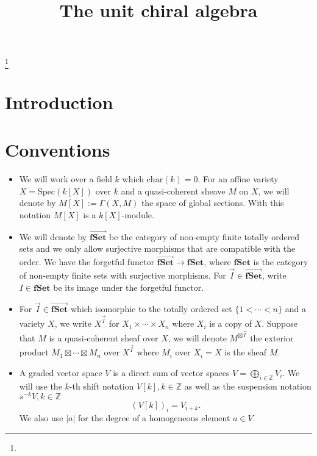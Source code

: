 \documentclass[11pt]{amsart}
\theoremstyle{definition}
\theoremstyle{remark}
\numberwithin{equation}{section}
\begin{document}
\title[]{The unit chiral algebra}%
\author{}%
\address{}%
\email{}%

\thanks{}%
\subjclass{}%
\keywords{}%

\begin{abstract}

\end{abstract}
\maketitle
\tableofcontents



\section{Introduction}
\section{Conventions}

\begin{itemize}

\item We will work over a field $k$ which $\mathrm{char}(k)=0$. For an affine variety $X=\mathrm{Spec}(k[X])$ over $k$ and a quasi-coherent sheave $M$ on $X$, we will denote by $M[X]:=\Gamma(X,M)$ the space of global sections. With this notation $M[X]$ is a $k[X]$-module.



\item We will denote by $\overrightarrow{\mathbf{fSet}}$ be the category of non-empty finite totally ordered sets and we only allow surjective morphisms that are compatible with the order. We have the forgetful functor $\overrightarrow{\mathbf{fSet}}\rightarrow \mathbf{fSet}$, where $\mathbf{fSet}$ is the category of non-empty finite sets with surjective morphisms. For $\vec{I}\in \overrightarrow{\mathbf{fSet}}$, write $I\in \mathbf{fSet}$ be its image under the forgetful functor.
\item For $\vec{I}\in \overrightarrow{\mathbf{fSet}}$ which isomorphic to the totally ordered set $\{1<\cdots<n\}$ and a variety $X$, we write $X^{\vec{I}}$ for $X_1\times \cdots \times X_n$ where $X_i$ is a copy of $X$. Suppose that $M$ is a quasi-coherent sheaf over $X$, we will denote $M^{\boxtimes\vec{I}}$ the exterior product $M_1\boxtimes \cdots \boxtimes M_n$ over $X^{\vec{I}}$ where $M_i$ over $X_i=X$ is the sheaf $M$.
\item A graded vector space $V$ is a direct sum of vector spaces $V=\mathop{\bigoplus}\limits_{i\in\mathbb{Z}}V_i$. We will use the $k$-th shift notation $V[k],k\in \mathbb{Z}$ as well as the suspension notation $s^{-k}V,k\in\mathbb{Z}$
$$
(V[k])_i=V_{i+k}.$$
We also use $|a|$ for the degree of a homogeneous element $a\in V.$
\end{itemize}
\end{document}
